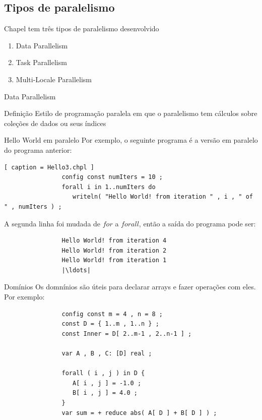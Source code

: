 	\subsection{Tipos de paralelismo}
		\begin{frame}
			\begin{block}{}
				Chapel tem três tipos de paralelismo desenvolvido
				\begin{enumerate}
					\item Data Parallelism
					\item Task Parallelism
					\item Multi-Locale Parallelism
				\end{enumerate}
			\end{block}
		\end{frame}
		
		\begin{frame}[fragile]{Data Parallelism}
			\begin{block}{Definição}
				Estilo de programação paralela em que o paralelismo tem cálculos sobre coleções de dados ou seus índices
			\end{block}
		\end{frame}
		\begin{frame}[fragile]{Hello World em paralelo}
			Por exemplo, o seguinte programa é a versão em paralelo do programa anterior:
			\begin{lstlisting}[ caption = Hello3.chpl ]
				config const numIters = 10 ;
				forall i in 1..numIters do
				   writeln( "Hello World! from iteration " , i , " of " , numIters ) ;
			\end{lstlisting}
			A segunda linha foi mudada de $for$ a $forall$, então a saída do programa pode ser:
			\begin{lstlisting}
				Hello World! from iteration 4
				Hello World! from iteration 2
				Hello World! from iteration 1
				|\ldots|
			\end{lstlisting}
		\end{frame}
		\begin{frame}[fragile]{Domínios}
			Os domnínios são úteis para declarar arrays e fazer operações com eles. Por exemplo:
			\begin{lstlisting}
				config const m = 4 , n = 8 ;
				const D = { 1..m , 1..n } ;
				const Inner = D[ 2..m-1 , 2..n-1 ] ;
				
				var A , B , C: [D] real ;
				
				forall ( i , j ) in D {
				   A[ i , j ] = -1.0 ;
				   B[ i , j ] = 4.0 ;
				}
				var sum = + reduce abs( A[ D ] + B[ D ] ) ;
			\end{lstlisting}
		\end{frame}
